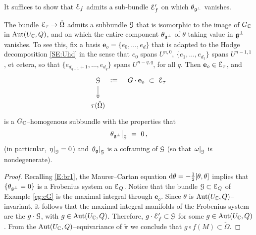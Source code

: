 \documentclass[12pt]{amsart}
\numberwithin{equation}{section}
\numberwithin{table}{section}
\numberwithin{figure}{section}
\begin{document}
\begin{claim} \label{cl:cE'}
It suffices to show that $\mathcal E_f$ admits a sub-bundle $\mathcal E_f^{\prime}$ on which $\theta_{{\mathfrak{g}}^\perp}$ vanishes.
\end{claim}

\begin{example} \label{eg:cG}
The bundle $\mathcal E_\tau \to \check\Omega$ admits a subbundle $\mathcal G$ that is isomorphic to the image of $G_\mathbb C$ in $\mathrm{Aut}(U_\mathbb C,Q)$, and on which the entire component $\theta_{{\mathfrak{g}}^\perp}$ of $\theta$ taking value in ${\mathfrak{g}}^\perp$ vanishes.  To see this, fix a basis $\mathbf{e}_o = \{ e_0 , \ldots , e_d\}$ that is adapted to the Hodge decomposition \eqref{SE:Uhd} in the sense that $e_0$ spans $U^{n,0}$, $\{ e_1 , \ldots , e_{d_1}\}$ spans $U^{n-1,1}$, et cetera, so that $\{ e_{d_{q-1}+1} , \ldots , e_{d_q} \}$ spans $U^{n-q,q}$, for all $q$.  Then $\mathbf{e}_o \in\mathcal E_\tau$, and  
\[
\begin{tikzcd}
  \cG \arrow[r,phantom,":=",description] \arrow[d , ->>] 
  & G \cdot \mathbf{e}_o \ \subset \ \cE_\tau \\
  \tau(\check\Omega)
\end{tikzcd}
\]
is a $G_\mathbb C$--homogenous subbundle with the properties that 
\begin{equation}\label{E:gperpcG}
  \left.\theta_{{\mathfrak{g}}^\perp}\right|_\mathcal G \ = \ 0 \,,
\end{equation}
(in particular, $\left.\eta\right|_\mathcal G = 0$)
and $\left.\theta_{{\mathfrak{g}}}\right|_\mathcal G$ is a coframing of $\mathcal G$ (so that $\left.\omega\right|_{\mathcal G}$ is nondegenerate).  %
\end{example}

\begin{proof}
Recalling \eqref{E:br1}, the Maurer--Cartan equation $\mathrm{d} \theta = -\tfrac{1}{2}[\theta,\theta]$ implies that $\{ \theta_{{\mathfrak{g}}^\perp} = 0\}$ is a Frobenius system on $\mathcal E_Q$.  Notice that the bundle $\mathcal G \subset \mathcal E_Q$ of Example \ref{eg:cG} is the maximal integral through $\mathbf{e}_o$.  Since $\theta$ is $\mathrm{Aut}(U_\mathbb C,Q)$--invariant, it follows that the maximal integral manifolds of the Frobenius system are the $g\cdot \mathcal G$, with $g \in \mathrm{Aut}(U_\mathbb C,Q)$.  Therefore, $g \cdot \mathcal E_f^{\prime} \subset \mathcal G$ for some $g \in \mathrm{Aut}(U_\mathbb C,Q)$. From the $\mathrm{Aut}(U_\mathbb C,Q)$--equivariance of $\check\pi$ we conclude that $g \circ f(M) \subset \check \Omega$.
\end{proof}
\end{document}

